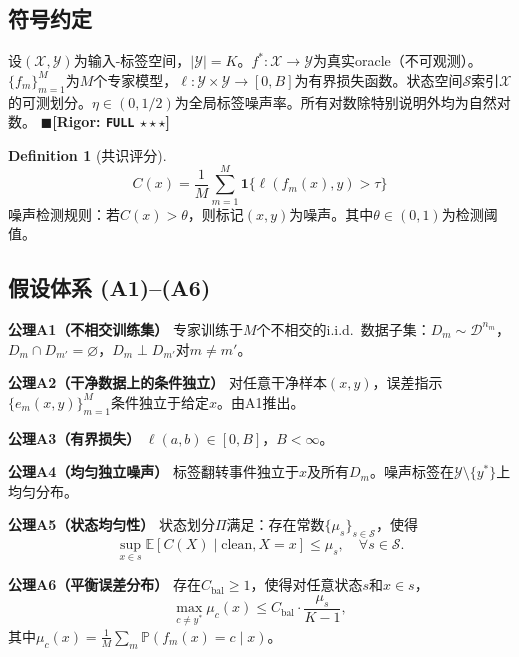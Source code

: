 \documentclass[12pt,a4paper]{ctexart}
\theoremstyle{definition}
\newtheorem{definition}{Definition}[section]
\theoremstyle{remark}
\newcommand{\rigorFull}{$\blacksquare$\;\textbf{[Rigor: \texttt{FULL} $\star\star\star$]}}
\begin{document}
\subsection{符号约定}

设$(\mathcal{X}, \mathcal{Y})$为输入-标签空间，$|\mathcal{Y}| = K$。$f^*: \mathcal{X} \to \mathcal{Y}$为真实oracle（不可观测）。$\{f_m\}_{m=1}^M$为$M$个专家模型，$\ell: \mathcal{Y} \times \mathcal{Y} \to [0, B]$为有界损失函数。状态空间$\mathcal{S}$索引$\mathcal{X}$的可测划分。$\eta \in (0, 1/2)$为全局标签噪声率。所有对数除特别说明外均为自然对数。
\rigorFull

\begin{definition}[共识评分]
\begin{equation}
C(x) = \frac{1}{M}\sum_{m=1}^{M} \mathbf{1}\{\ell(f_m(x), y) > \tau\}
\end{equation}
噪声检测规则：若$C(x) > \theta$，则标记$(x, y)$为噪声。其中$\theta \in (0, 1)$为检测阈值。
\end{definition}

\subsection{假设体系 (A1)–(A6)}

\textbf{公理A1（不相交训练集）} 专家训练于$M$个不相交的i.i.d.\ 数据子集：$D_m \sim \mathcal{D}^{n_m}$，$D_m \cap D_{m'} = \varnothing$，$D_m \perp D_{m'}$对$m \neq m'$。

\textbf{公理A2（干净数据上的条件独立）} 对任意干净样本$(x, y)$，误差指示$\{e_m(x,y)\}_{m=1}^M$条件独立于给定$x$。由A1推出。

\textbf{公理A3（有界损失）} $\ell(a, b) \in [0, B]$，$B < \infty$。

\textbf{公理A4（均匀独立噪声）} 标签翻转事件独立于$x$及所有$D_m$。噪声标签在$\mathcal{Y}\setminus\{y^*\}$上均匀分布。

\textbf{公理A5（状态均匀性）} 状态划分$\Pi$满足：存在常数$\{\mu_s\}_{s\in\mathcal{S}}$，使得
\begin{equation}
\sup_{x \in s} \mathbb{E}[C(X) \mid \text{clean}, X=x] \leq \mu_s, \quad \forall s \in \mathcal{S}.
\end{equation}

\textbf{公理A6（平衡误差分布）} 存在$C_{\text{bal}} \geq 1$，使得对任意状态$s$和$x \in s$，
\begin{equation}
\max_{c \neq y^*} \mu_c(x) \leq C_{\text{bal}} \cdot \frac{\mu_s}{K-1},
\end{equation}
其中$\mu_c(x) = \frac{1}{M}\sum_m \mathbb{P}(f_m(x) = c \mid x)$。
\end{document}

